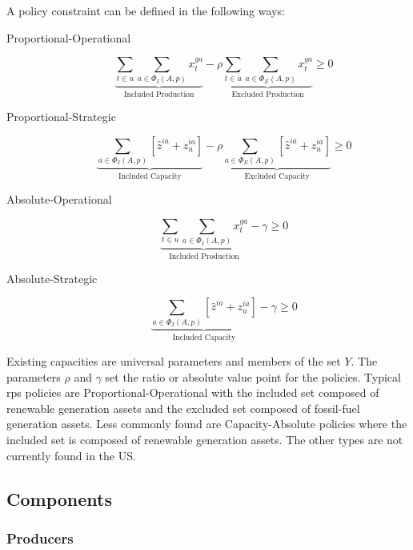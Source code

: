 A policy constraint can be defined in the following ways:

\begin{description}
	\item[Proportional-Operational] \begin{equation}
		\underbrace{\sum_{t \in u}\sum_{a \in \Phi_I(A, p)} x^{ga}_t}_{\text{Included Production}} - \rho \underbrace{\sum_{t \in u}\sum_{a \in \Phi_E(A, p)} x^{ga}_t}_{\text{Excluded Production}} \geq 0
	\end{equation}
	\item[Proportional-Strategic] \begin{equation}
		\underbrace{\sum_{a \in \Phi_I(A, p)} \left[\hat{z}^{ia} + z^{ia}_u\right]}_{\text{Included Capacity}} - \rho \underbrace{\sum_{a \in \Phi_E(A, p)} \left[\hat{z}^{ia} + z^{ia}_u\right]}_{\text{Excluded Capacity}} \geq 0
	\end{equation}
	\item[Absolute-Operational] \begin{equation}
		\underbrace{\sum_{t \in u}\sum_{a \in \Phi_I(A, p)} x^{ga}_t}_{\text{Included Production}} - \gamma \geq 0
	\end{equation}
	\item[Absolute-Strategic] \begin{equation}
		\underbrace{\sum_{a \in \Phi_I(A, p)} \left[\hat{z}^{ia} + z^{ia}_u\right]}_{\text{Included Capacity}} - \gamma \geq 0
	\end{equation}
\end{description}

Existing capacities are universal parameters and members of the set $Y$. The parameters $\rho$ and $\gamma$ set the ratio or absolute value point for the policies. Typical \gls{rps} policies are Proportional-Operational with the included set composed of renewable generation assets and the excluded set composed of fossil-fuel generation assets. Less commonly found are Capacity-Absolute policies where the included set is composed of renewable generation assets. The other types are not currently found in the US.

\subsection{Components}

\subsubsection{Producers}

